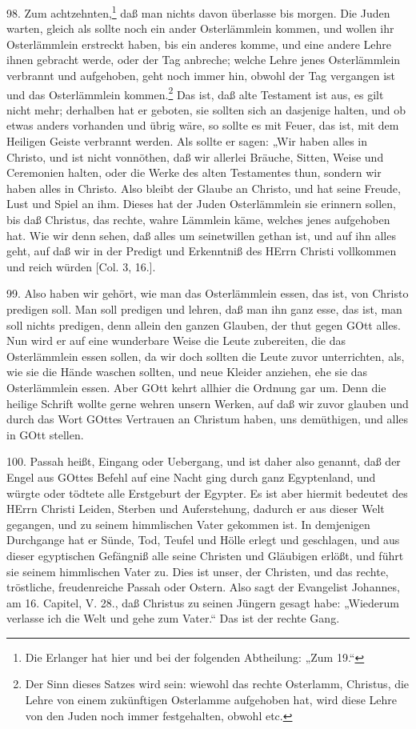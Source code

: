 98. Zum achtzehnten,\footnote{Die Erlanger hat hier und bei der folgenden Abtheilung: „Zum 19.“} daß man nichts davon überlasse bis morgen. Die Juden warten, gleich als sollte noch ein ander Osterlämmlein kommen, und wollen ihr Osterlämmlein erstreckt haben, bis ein anderes komme, und eine andere Lehre ihnen gebracht werde, oder der Tag anbreche; welche Lehre jenes Osterlämmlein verbrannt und aufgehoben, geht noch immer hin, obwohl der Tag vergangen ist und das Osterlämmlein kommen.\footnote{Der Sinn dieses Satzes wird sein: wiewohl das rechte Osterlamm, Christus, die Lehre von einem zukünftigen Osterlamme aufgehoben hat, wird diese Lehre von den Juden noch immer festgehalten, obwohl etc.} Das ist, daß alte Testament ist aus, es gilt nicht mehr; derhalben hat er geboten, sie sollten sich an dasjenige halten, und ob etwas anders vorhanden und übrig wäre, so sollte es mit Feuer, das ist, mit dem
Heiligen Geiste verbrannt werden. Als sollte er sagen: „Wir haben alles in Christo, und ist nicht vonnöthen, daß wir allerlei Bräuche, Sitten, Weise und Ceremonien halten, oder die Werke des alten Testamentes thun, sondern wir haben alles in Christo. Also bleibt der Glaube an Christo, und hat seine Freude, Lust und Spiel an ihm. Dieses hat der Juden Osterlämmlein sie erinnern sollen, bis daß Christus, das rechte, wahre Lämmlein käme, welches jenes aufgehoben hat. Wie wir denn sehen, daß alles um seinetwillen gethan ist, und auf ihn alles geht, auf daß wir in der Predigt und Erkenntniß des HErrn Christi vollkommen und reich würden [Col. 3, 16.].

99. Also haben wir gehört, wie man das Osterlämmlein essen, das ist, von Christo predigen soll. Man soll predigen und lehren, daß man ihn ganz esse, das ist, man soll nichts predigen, denn allein den ganzen Glauben, der thut gegen GOtt alles. Nun wird er auf eine wunderbare Weise die Leute zubereiten, die das Osterlämmlein essen sollen, da wir doch sollten die Leute zuvor unterrichten, als, wie sie die Hände waschen sollten, und neue Kleider anziehen, ehe sie das Osterlämmlein essen. Aber GOtt kehrt allhier die Ordnung gar um. Denn die heilige Schrift wollte gerne wehren unsern Werken, auf daß wir zuvor glauben und durch das Wort GOttes Vertrauen an Christum haben, uns demüthigen, und alles in GOtt stellen.

100. Passah heißt, Eingang oder Uebergang, und ist daher also genannt, daß der Engel aus GOttes Befehl auf eine Nacht ging durch ganz Egyptenland, und würgte oder tödtete alle Erstgeburt der Egypter. Es ist aber hiermit bedeutet des HErrn Christi Leiden, Sterben und Auferstehung, dadurch er aus dieser Welt gegangen, und zu seinem himmlischen Vater gekommen ist. In demjenigen Durchgange hat er Sünde, Tod, Teufel und Hölle erlegt und geschlagen, und aus dieser egyptischen Gefängniß alle seine Christen und Gläubigen erlößt, und führt sie seinem himmlischen Vater zu. Dies ist unser, der Christen, und das rechte, tröstliche, freudenreiche Passah oder Ostern. Also sagt der Evangelist Johannes, am 16. Capitel, V. 28., daß Christus zu seinen Jüngern gesagt habe: „Wiederum verlasse ich die Welt und gehe zum Vater.“ Das ist der rechte Gang.

